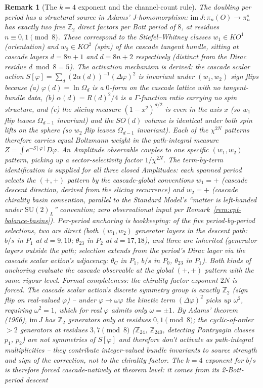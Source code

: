 \documentclass[12pt,a4paper]{article}
\newtheorem*{remark}{Remark}
\begin{document}
\begin{remark}[The $k=4$ exponent and the channel-count rule]
The doubling per period has a structural source in Adams' J-homomorphism: $\mathrm{im}\,J\colon\pi_n(O)\to\pi^s_n$ has exactly two free $\mathbb{Z}_2$ direct factors per Bott period of $8$, at residues $n\equiv 0,1\pmod 8$. These correspond to the Stiefel--Whitney classes $w_1\in KO^1$ (orientation) and $w_2\in KO^2$ (spin) of the cascade tangent bundle, sitting at cascade layers $d=8n+1$ and $d=8n+2$ respectively (distinct from the Dirac residue $d\bmod 8 = 5$). The activation mechanism is derived: the cascade scalar action $S[\varphi]=\sum_d (2\alpha(d))^{-1}(\Delta\varphi)^2$ is invariant under $(w_1, w_2)$ sign flips because (a) $\varphi(d)=\ln\Omega_d$ is a $0$-form on the cascade lattice with no tangent-bundle data, (b) $\alpha(d)=R(d)^2/4$ is a $\Gamma$-function ratio carrying no spin structure, and (c) the slicing measure $(1-x^2)^{d/2}$ is even in the axis $x$ (so $w_1$ flip leaves $\Omega_{d-1}$ invariant) and the $SO(d)$ volume is identical under both spin lifts on the sphere (so $w_2$ flip leaves $\Omega_{d-1}$ invariant). Each of the $\chi^{2N}$ patterns therefore carries equal Boltzmann weight in the path-integral measure $Z=\int e^{-S[\varphi]} D\varphi$. An Amplitude observable couples to one specific $(w_1,w_2)$ pattern, picking up a sector-selectivity factor $1/\chi^{2N}$. The term-by-term identification is supplied for all three closed Amplitudes: each spanned period selects the $(+, +)$ pattern by the cascade-global conventions $w_1=+$ (cascade descent direction, derived from the slicing recurrence) and $w_2=+$ (cascade chirality basin convention, parallel to the Standard Model's ``matter is left-handed under $\mathrm{SU}(2)_L$'' convention; zero observational input per Remark~\ref{rem:cpt-balance-basins}). Per-period anchoring is bookkeeping: of the five period-by-period selections, two are \emph{direct} (both $(w_1,w_2)$ generator layers in the descent path: $b/s$ in $P_1$ at $d=9,10$; $\theta_{23}$ in $P_2$ at $d=17,18$), and three are \emph{inherited} (generator layers outside the path; selection extends from the period's Dirac layer via the cascade scalar action's adjacency: $\theta_C$ in $P_1$, $b/s$ in $P_0$, $\theta_{23}$ in $P_1$). Both kinds of anchoring evaluate the cascade observable at the global $(+, +)$ pattern with the same rigour level. \emph{Formal completeness:} the chirality factor exponent $2N$ is forced. The cascade scalar action's discrete symmetry group is exactly $\mathbb{Z}_2$ (sign flip on real-valued $\varphi$) -- under $\varphi\to\omega\varphi$ the kinetic term $(\Delta\varphi)^2$ picks up $\omega^2$, requiring $\omega^2=1$, which for real $\varphi$ admits only $\omega=\pm 1$. By Adams' theorem (1966), $\mathrm{im}\,J$ has $\mathbb{Z}_2$ generators only at residues $0,1\pmod 8$; the cyclic-of-order $>2$ generators at residues $3,7\pmod 8$ ($\mathbb{Z}_{24}$, $\mathbb{Z}_{240}$, detecting Pontryagin classes $p_1$, $p_2$) are not symmetries of $S[\varphi]$ and therefore don't activate as path-integral multiplicities -- they contribute integer-valued bundle invariants to source strength and sign of the correction, not to the chirality factor. The $k=4$ exponent for $b/s$ is therefore forced cascade-natively at theorem level: it comes from its 2-Bott-period descent 
\end{remark}
\end{document}
